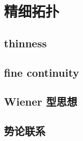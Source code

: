 \section{精细拓扑}
\label{b1:sec:2604}


\subsection{thinness}
\label{b1:subsec:260401}

\subsection{fine continuity}
\label{b1:subsec:260402}

\subsection{Wiener 型思想}
\label{b1:subsec:260403}

\subsection{势论联系}
\label{b1:subsec:260404}


